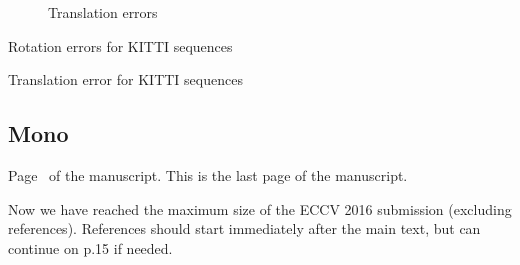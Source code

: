 \documentclass[runningheads]{llncs}
\begin{document}
\begin{figure}
\begin{minipage}[t]{.3\linewidth}
  \end{minipage}
  \caption{Translation errors}
\end{figure}

\begin{table}
\centering
\caption{Rotation errors for KITTI sequences}
\smallskip\noindent
\resizebox{\linewidth}{!}{%

}
\end{table}

\begin{table}
\centering
\caption{Translation error for KITTI sequences}

\end{table}

\subsection{Mono}

\clearpage\mbox{}Page \thepage\ of the manuscript.  This is the last
page of the manuscript.
\par\vfill\par
Now we have reached the maximum size of the ECCV 2016 submission (excluding references).
References should start immediately after the main text, but can continue on p.15 if needed.

\clearpage



\end{document}
